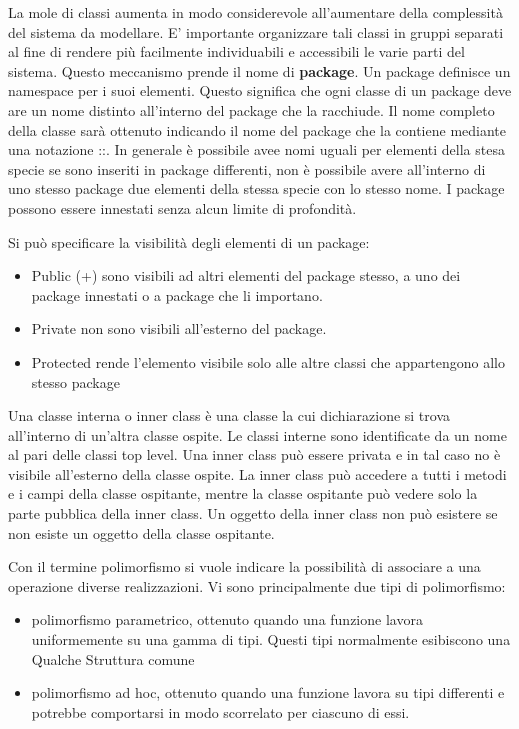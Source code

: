 \documentclass[a4paper,18pt]{extarticle}
\begin{document}
La mole di classi aumenta in modo considerevole all'aumentare della complessità del sistema da modellare. E' importante organizzare tali classi in gruppi separati al fine di rendere più facilmente individuabili e accessibili le varie parti del sistema. Questo meccanismo prende il nome di \textbf{package}. Un package definisce un namespace per i suoi elementi. Questo significa che ogni classe di un package deve are un nome distinto all'interno del package che la racchiude. Il nome completo della classe sarà ottenuto indicando il nome del package che la contiene mediante una notazione ::. In generale è possibile avee nomi uguali per elementi della stesa specie se sono inseriti in package differenti, non è possibile avere all'interno di uno stesso package due elementi della stessa specie con lo stesso nome. I package possono essere innestati senza alcun limite di profondità.

Si può specificare la visibilità degli elementi di un package:
\begin{itemize}
	\item Public (+) sono visibili ad altri elementi del package stesso, a uno dei package innestati o a package che li importano.
	\item Private non sono visibili all'esterno del package.
	\item Protected rende l'elemento visibile solo alle altre classi che appartengono allo stesso package
\end{itemize}

Una classe interna o inner class è una classe la cui dichiarazione si trova all'interno di un'altra classe ospite. Le classi interne sono identificate da un nome al pari delle classi top level. Una inner class può essere privata e in tal caso no è visibile all'esterno della classe ospite. La inner class può accedere a tutti i metodi e i campi della classe ospitante, mentre la classe ospitante può vedere solo la parte pubblica della inner class. Un oggetto della inner class non può esistere se non esiste un oggetto della classe ospitante.

Con il termine polimorfismo si vuole indicare la possibilità di associare a una operazione diverse realizzazioni. Vi sono principalmente due tipi di polimorfismo:
\begin{itemize}
	\item polimorfismo parametrico, ottenuto quando una funzione lavora uniformemente su una gamma di tipi. Questi tipi normalmente esibiscono una Qualche Struttura comune
	\item polimorfismo ad hoc, ottenuto quando una funzione lavora su tipi differenti e potrebbe comportarsi in modo scorrelato per ciascuno di essi.
\end{itemize}
\end{document}
